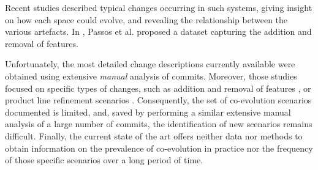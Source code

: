 Recent studies \citep{passos_coevolution_2015,neves_safe_2015} described typical changes occurring in such systems,
giving insight on how each space could evolve, and revealing the relationship between the various artefacts.
In \citep{passos_dataset_2014}, Passos et al. proposed a dataset capturing the addition and removal of features.

Unfortunately, the most detailed change descriptions currently available \citep{passos_coevolution_2015,neves_safe_2015}
were obtained using extensive \textit{manual} analysis of commits.
Moreover, those studies focused on specific types of changes, such as addition and removal of features \citep{passos_coevolution_2015}, or product line refinement scenarios \citep{neves_safe_2015}. 
Consequently, the set of co-evolution scenarios documented is limited, and, saved by performing a similar
extensive manual analysis of a large number of commits, the identification of new scenarios remains difficult. 
Finally, the current state of the art offers neither data nor methods to obtain information on 
the prevalence of co-evolution in practice nor the frequency of those specific scenarios over a long period of time.

